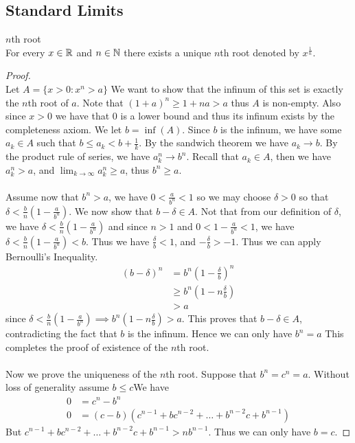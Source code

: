 \documentclass[a4paper]{article}
\begin{document}
\subsection{Standard Limits}
\begin{thm}{$n$th root}{}\\ For every $x\in\mathbb{R}$ and $n\in\mathbb{N}$ there exists a unique $n$th root denoted by $x^\frac{1}{n}$. 
\begin{proof}\\ Let $A=\{x>0:x^n>a\}$ We want to show that the infinum of this set is exactly the $n$th root of $a$. Note that $(1+a)^n\geq1+na>a$ thus $A$ is non-empty. Also since $x>0$ we have that $0$ is a lower bound and thus its infinum exists by the completeness axiom. We let $b=\inf(A)$. Since $b$ is the infinum, we have some $a_k\in A$ such that $b\leq a_k<b+\frac{1}{k}$. By the sandwich theorem we have $a_k\to b$. By the product rule of series, we have $a_k^n\to b^n$. Recall that $a_k\in A$, then we have $a_k^n>a$, and $\lim_{k\to\infty}a_k^n\geq a$, thus $b^n\geq a$. \\~\\
Assume now that $b^n>a$, we have $0<\frac{a}{b^n}<1$ so we may choose $\delta>0$ so that $\delta<\frac{b}{n}(1-\frac{a}{b^n})$. We now show that $b-\delta\in A$. Not that from our definition of $\delta$, we have $\delta<\frac{b}{n}(1-\frac{a}{b^n})$ and since $n>1$ and $0<1-\frac{a}{b^n}<1$, we have $\delta<\frac{b}{n}\left(1-\frac{a}{b^n}\right)<b$. Thus we have $\frac{\delta}{b}<1$, and $-\frac{\delta}{b}>-1$. Thus we can apply Bernoulli's Inequality. 
\begin{align*}
(b-\delta)^n&=b^n\left(1-\frac{\delta}{b}\right)^n \\
&\geq b^n\left(1-n\frac{\delta}{b}\right) \tag{By Bernoulli's Inequality} \\
&>a
\end{align*}
since $\delta<\frac{b}{n}\left(1-\frac{a}{b^n}\right)\implies b^n\left(1-n\frac{\delta}{b}\right)>a$. This proves that $b-\delta\in A$, contradicting the fact that $b$ is the infinum. Hence we can only have $b^n=a$ This completes the proof of existence of the $n$th root.\\~\\
Now we prove the uniqueness of the $n$th root. Suppose that $b^n=c^n=a$. Without loss of generality assume $b\leq c$We have
\begin{align*}
0&=c^n-b^n \\
0&=(c-b)(c^{n-1}+bc^{n-2}+\dots+b^{n-2}c+b^{n-1})
\end{align*}
But $c^{n-1}+bc^{n-2}+\dots+b^{n-2}c+b^{n-1}>nb^{n-1}$. Thus we can only have $b=c$. 
\end{proof}
\end{thm}
\end{document}
